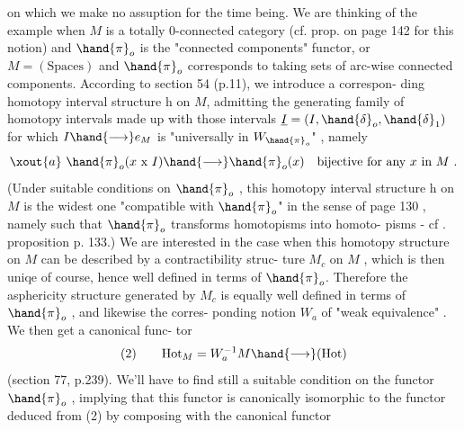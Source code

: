 on which we make no assuption for the time being. We are thinking of
the example when $M$ is a totally 0-connected category (cf. prop. on page
142 for this notion) and $\hand{\pi}_o$ is the "connected components" functor, or 
$M = (\mathrm{Spaces})$ and $\hand{\pi}_o$ corresponds to taking sets of arc-wise connected
components. According to section 54 (p.11), we introduce a correspon-%
ding homotopy interval structure h on $M$, admitting the generating family
of homotopy intervals made up with those intervals $\underline{I} = (I,\hand{\delta}_o,\hand{\delta}_1)$ 
for which $I \hand{\longrightarrow} e_M$ is "universally in $W_{\hand{\pi}_o}$" , namely
\[ \xout{a}\ \hand{\pi}_o(x \text{ x } I) \hand{\longrightarrow} \hand{\pi}_o(x) \quad \text{bijective for any } x \text{ in } M \ . \]
(Under suitable conditions on $\hand{\pi}_o$ , this  homotopy interval
structure h on $M$ is the widest one "compatible with $\hand{\pi}_o$" in the sense
of page 130 , namely such that $\hand{\pi}_o$ transforms homotopisms into homoto-%
pisms - cf . proposition p. 133.) We are interested in the case when
this homotopy structure on $M$ can be described by a contractibility struc-%
ture $M_c$ on $M$ , which is then uniqe of course, hence well defined in
terms of $\hand{\pi}_o$. Therefore the asphericity structure  generated
by $M_c$ is equally well defined in terms of $\hand{\pi}_o$ , and likewise the corres-%
ponding notion $W_a$ of "weak equivalence" . We then get a canonical func-%
tor
\[ (2) \qquad \mathrm{Hot}_M = W_a^{-1}M \hand{\longrightarrow} (\mathrm{Hot}) \]
(section 77, p.239). We'll have to find still a suitable  condition on
the functor $\hand{\pi}_o$ , implying that this functor is canonically isomorphic
to the functor deduced from (2) by composing with the canonical functor

